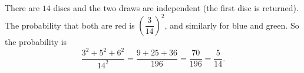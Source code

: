 There are $14$ discs and the two draws are independent (the first disc is returned). The probability that both are red is $\left(\dfrac{3}{14}\right)^2$, and similarly for blue and green. So the probability is
\[
\dfrac{3^2+5^2+6^2}{14^2}=\dfrac{9+25+36}{196}=\dfrac{70}{196}=\boxed{\dfrac{5}{14}}.
\]
